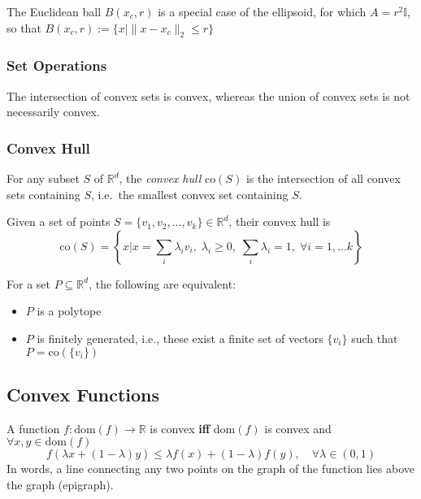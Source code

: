 The Euclidean ball $B(x_c,r)$ is a special case of the ellipsoid, for which $A=r^2 \mathbb{I}$, so that $B(x_c,r):=\{x| \|x-x_c\|_2\leq r\}$

\subsubsection{Set Operations}
The intersection of convex sets is convex, whereas the union of convex sets is not necessarily convex.

\subsubsection{Convex Hull}\label{ssec:convex_hull}
For any subset $S$ of $\mathbb{R}^d$, the \textit{convex hull} $\mathrm{co}(S)$ is the intersection of all convex sets containing $S$, i.e.\ the smallest convex set containing $S$.

\newpar{}

Given a set of points $S=\{v_1, v_2, \ldots, v_k\} \in \mathbb{R}^d$, their convex hull is
\begin{equation*}
    \mathrm{co}(S) = \left\{ x\Bigg| x = \sum_i \lambda_i v_i, \; \lambda_i \geq 0,\; \sum_i \lambda_i = 1,\; \forall i=1,\ldots k \right\}
\end{equation*}

\newpar{}

For a set $P\subseteq \mathbb{R}^d$, the following are equivalent:
\begin{itemize}
    \item $P$ is a polytope
    \item $P$ is finitely generated, i.e., these exist a finite set of vectors $\{v_i\}$ such that $P=\mathrm{co}(\{v_i\})$
\end{itemize}

\subsection{Convex Functions}
A function $f:\text{dom}(f) \rightarrow \mathbb{R}$ is convex \textbf{iff} $\text{dom}(f)$ is convex and $\forall x,y \in \text{dom}(f)$
\begin{equation*}
    f(\lambda x + (1-\lambda)y) \leq \lambda f(x) + (1-\lambda)f(y),\quad \forall \lambda \in (0,1)
\end{equation*}
In words, a line connecting any two points on the graph of the function lies above the graph (epigraph).

